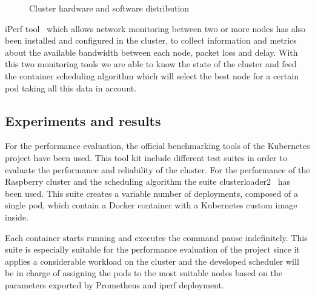\documentclass[conference]{IEEEtran}
\begin{document}
\begin{figure}[h]
\begin{center}
\strut{}
\caption{Cluster hardware and software distribution}\label{fig:clusterswhw}
\end{center}
\end{figure}


iPerf tool~\cite{iperf} which allows network monitoring between two or more nodes has also been installed and configured in the cluster, to collect information and metrics
about the available bandwidth between each node, packet loss and delay. With this two monitoring tools we are able to know the state of the cluster and feed the
container scheduling algorithm which will select the best node for a certain pod taking all this data in account.




\subsection{Experiments and results}\label{sec:expe}

For the performance evaluation, the official benchmarking tools of the Kubernetes project have been used. This tool kit include different test suites in order to evaluate the performance and reliability of the cluster. For the performance of the Raspberry cluster and the scheduling algorithm the suite clusterloader2~\cite{clusterloader2}  has been used. This suite creates a variable number of deployments, composed of a single pod, which contain a Docker container with a Kubernetes custom image inside. %


Each container starts running and executes the command pause indefinitely. This suite is especially suitable for the performance evaluation of the project since it applies a considerable workload on the cluster and the developed scheduler will be in charge of assigning the pods to the most suitable nodes based on the parameters exported by Prometheus and iperf deployment.
\end{document}
